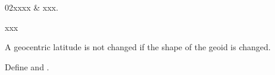 %
%
 \label{sec:ppath}

%
%
\starthistory
  02xxxx & xxx.\\
\stophistory


%
%
%



xxx



\label{sec:ppath:geoid}

A geocentric latitude is not changed if the shape of the geoid is
changed.

Define  and .




